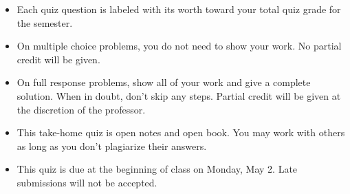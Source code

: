 \documentclass[12pt]{exam}
\newcommand{\<}{(}
\renewcommand{\>}{)}
\begin{document}
\begin{center}
\end{center}
\vspace{0.1in}

\vspace{12pt}

\begin{itemize}
  \item Each quiz question is labeled with its worth toward your total quiz
        grade for the semester.
  \item On multiple choice problems, you do not need to show your work. No
        partial credit will be given.
  \item On full response problems, show all of your work and give a
        complete solution. When in doubt, don't skip any steps. Partial
        credit will be given at the discretion of the professor.
  \item This take-home
        quiz is open notes and open book. You may work with others as
        long as you don't plagiarize their answers.
  \item This quiz is due at the beginning of class on Monday, May 2.
        Late submissions will not be accepted.
\end{itemize}

\newpage
\end{document}
